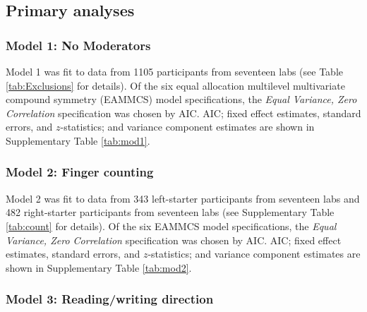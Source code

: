 \documentclass[A4paper,man,floatsintext]{apa6}
\theoremstyle{definition}
\theoremstyle{definition}
\theoremstyle{definition}
\theoremstyle{remark}
\begin{document}
\printbibliography[title=References]

\clearpage
\makeatletter
\efloat@restorefloats
\makeatother


\begin{appendix}
\section{}
\renewcommand{\thetable}{S\arabic{table}}
\renewcommand{\thefigure}{S\arabic{figure}}

 \setcounter{page}{1}

\subsection{Primary analyses}\label{primary-analyses}

\subsubsection{Model 1: No Moderators}\label{model-1-no-moderators}

Model 1 was fit to data from 1105 participants from seventeen labs (see
Table \ref{tab:Exclusions} for details). Of the six equal allocation
multilevel multivariate compound symmetry (EAMMCS) model specifications,
the \emph{Equal Variance, Zero Correlation} specification was chosen by
AIC. AIC; fixed effect estimates, standard errors, and \(z\)-statistics;
and variance component estimates are shown in Supplementary Table
\ref{tab:mod1}.

\subsubsection{Model 2: Finger counting}\label{model-2-finger-counting}

Model 2 was fit to data from 343 left-starter participants from
seventeen labs and 482 right-starter participants from seventeen labs
(see Supplementary Table \ref{tab:count} for details). Of the six EAMMCS
model specifications, the \emph{Equal Variance, Zero Correlation}
specification was chosen by AIC. AIC; fixed effect estimates, standard
errors, and \(z\)-statistics; and variance component estimates are shown
in Supplementary Table \ref{tab:mod2}.

\subsubsection{Model 3: Reading/writing
direction}\label{model-3-readingwriting-direction}


\end{appendix}
\end{document}
